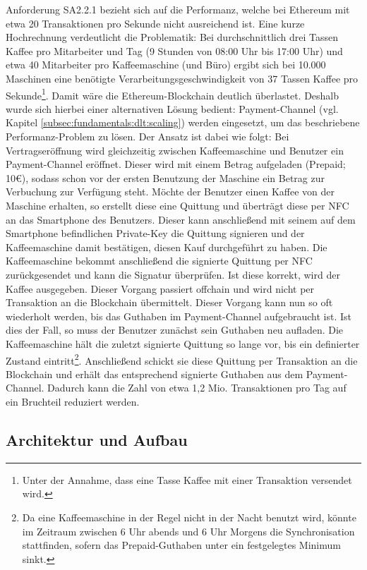 Anforderung SA2.2.1 bezieht sich auf die Performanz, welche bei Ethereum mit etwa 20 Transaktionen pro Sekunde nicht ausreichend ist. Eine kurze Hochrechnung verdeutlicht die Problematik: Bei durchschnittlich drei Tassen Kaffee pro Mitarbeiter und Tag (9 Stunden von 08:00 Uhr bis 17:00 Uhr) und etwa 40 Mitarbeiter pro Kaffeemaschine (und Büro) ergibt sich bei 10.000 Maschinen eine benötigte Verarbeitungsgeschwindigkeit von 37 Tassen Kaffee pro Sekunde\footnote{Unter der Annahme, dass eine Tasse Kaffee mit einer Transaktion versendet wird.}. Damit wäre die Ethereum-Blockchain deutlich überlastet. Deshalb wurde sich hierbei einer alternativen Lösung bedient: Payment-Channel (vgl. Kapitel \ref{subsec:fundamentals:dlt:scaling}) werden eingesetzt, um das beschriebene Performanz-Problem zu lösen. Der Ansatz ist dabei wie folgt: Bei Vertragseröffnung wird gleichzeitig zwischen Kaffeemaschine und Benutzer ein Payment-Channel eröffnet. Dieser wird mit einem Betrag aufgeladen (Prepaid; 10€), sodass schon vor der ersten Benutzung der Maschine ein Betrag zur Verbuchung zur Verfügung steht. Möchte der Benutzer einen Kaffee von der Maschine erhalten, so erstellt diese eine Quittung und überträgt diese per \ac{NFC} an das Smartphone des Benutzers. Dieser kann anschließend mit seinem auf dem Smartphone befindlichen Private-Key die Quittung signieren und der Kaffeemaschine damit bestätigen, diesen Kauf durchgeführt zu haben. Die Kaffeemaschine bekommt anschließend die signierte Quittung per \ac{NFC} zurückgesendet und kann die Signatur überprüfen. Ist diese korrekt, wird der Kaffee ausgegeben. Dieser Vorgang passiert offchain und wird nicht per Transaktion an die Blockchain übermittelt. Dieser Vorgang kann nun so oft wiederholt werden, bis das Guthaben im Payment-Channel aufgebraucht ist. Ist dies der Fall, so muss der Benutzer zunächst sein Guthaben neu aufladen. Die Kaffeemaschine hält die zuletzt signierte Quittung so lange vor, bis ein definierter Zustand eintritt\footnote{Da eine Kaffeemaschine in der Regel nicht in der Nacht benutzt wird, könnte im Zeitraum zwischen 6 Uhr abends und 6 Uhr Morgens die Synchronisation stattfinden, sofern das Prepaid-Guthaben unter ein festgelegtes Minimum sinkt.}. Anschließend schickt sie diese Quittung per Transaktion an die Blockchain und erhält das entsprechend signierte Guthaben aus dem Payment-Channel. Dadurch kann die Zahl von etwa 1,2 Mio. Transaktionen pro Tag auf ein Bruchteil reduziert werden.

\subsection{Architektur und Aufbau}
\label{subsec:implementation:poc:architecture}


